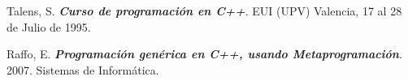 \begin{thebibliography}{IEEE}
 Talens, S. \textbf{\textit{Curso de programación en C++}}. EUI (UPV) Valencia, 17 al 28 de Julio de 1995. 

 Raffo, E. \textbf{\textit{Programación genérica en C++, usando Metaprogramación}}. 2007. Sistemas de Informática. 
\end{thebibliography}
